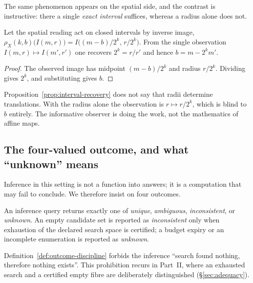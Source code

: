 The same phenomenon appears on the spatial side, and the contrast is instructive:
there a single \emph{exact interval} suffices, whereas a radius alone does not.

\begin{proposition}\label{prop:interval-recovery}
Let the spatial reading act on closed intervals by inverse image,
$\rho_X(k,b)\bigl(I(m,r)\bigr)=I\bigl((m-b)/2^{k},\,r/2^{k}\bigr)$.  From the single
observation $I(m,r)\mapsto I(m',r')$ one recovers $2^{k}=r/r'$ and hence
$b=m-2^{k}m'$.
\end{proposition}

\begin{proof}
The observed image has midpoint $(m-b)/2^{k}$ and radius $r/2^{k}$.  Dividing gives
$2^{k}$, and substituting gives $b$.
\end{proof}

\begin{warning}
Proposition~\ref{prop:interval-recovery} does not say that radii determine
translations.  With the radius alone the observation is $r\mapsto r/2^{k}$, which is
blind to $b$ entirely.  The informative observer is doing the work, not the
mathematics of affine maps.
\end{warning}

\subsection{The four-valued outcome, and what ``unknown'' means}

Inference in this setting is not a function into answers; it is a computation that
may fail to conclude.  We therefore insist on four outcomes.

\begin{definition}\label{def:outcome-discipline}
An inference query returns exactly one of \emph{unique}, \emph{ambiguous},
\emph{inconsistent}, or \emph{unknown}.  An empty candidate set is reported as
\emph{inconsistent} only when exhaustion of the declared search space is certified;
a budget expiry or an incomplete enumeration is reported as \emph{unknown}.
\end{definition}

\begin{warning}
\label{warn:unknown-not-nonexistence}
Definition~\ref{def:outcome-discipline} forbids the inference
``search found nothing, therefore nothing exists''.  This prohibition recurs in
Part~II, where an exhausted search and a certified empty fibre are deliberately
distinguished (\S\ref{sec:adequacy}).
\end{warning}

